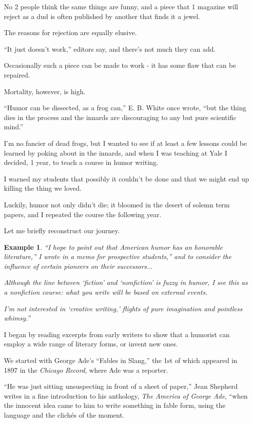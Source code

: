 \documentclass{book}
\numberwithin{equation}{section}
\newtheorem{example}{Example}[chapter]
\begin{document}
No 2 people think the same things are funny, and a piece that 1 magazine will reject as a dud is often published by another that finds it a jewel.

The reasons for rejection are equally elusive.

``It just doesn't work,'' editors say, and there's not much they can add.

Occasionally such a piece can be made to work - it has some flaw that can be repaired.

Mortality, however, is high.

``Humor can be dissected, as a frog can,'' E. B. White once wrote, ``but the thing dies in the process and the innards are discouraging to any but pure scientific mind.''

%
I'm no fancier of dead frogs, but I wanted to see if at least a few lessons could be learned by poking about in the innards, and when I was teaching at Yale I decided, 1 year, to teach a course in humor writing.

I warned my students that possibly it couldn't be done and that we might end up killing the thing we loved.

Luckily, humor not only didn't die; it bloomed in the desert of solemn term papers, and I repeated the course the following year.

Let me briefly reconstruct our journey.
\begin{example}
    ``I hope to point out that American humor has an honorable literature,'' I wrote in a memo for prospective students,'' and to consider the influence of certain pioneers on their successors$\ldots$
    
    Although the line between `fiction' and `nonfiction' is fuzzy in humor, I see this as a nonfiction course: what you write will be based on external events.
    
    I'm not interested in `creative writing,' flights of pure imagination and pointless whimsy.''
\end{example}
I began by reading excerpts from early writers to show that a humorist can employ a wide range of literary forms, or invent new ones.

We started with George Ade's ``Fables in Slang,'' the 1st of which appeared in 1897 in the \textit{Chicago Record}, where Ade was a reporter.

``He was just sitting unsuspecting in front of a sheet of paper,'' Jean Shepherd writes in a fine introduction to his anthology, \textit{The America of George Ade}, ``when the innocent idea came to him to write something in fable form, using the language and the clich\'es of the moment.
\end{document}
